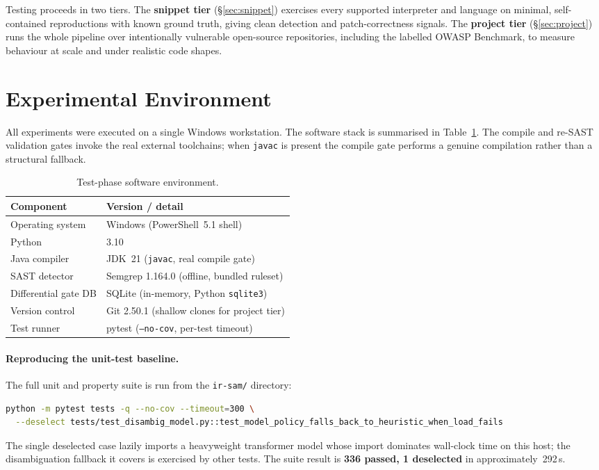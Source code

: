 \documentclass[11pt,a4paper]{article}
\newcommand{\code}[1]{\texttt{\small #1}}
\begin{document}
Testing proceeds in two tiers. The \textbf{snippet tier}
(\S\ref{sec:snippet}) exercises every supported interpreter and language
on minimal, self-contained reproductions with known ground truth, giving
clean detection and patch-correctness signals. The \textbf{project tier}
(\S\ref{sec:project}) runs the whole pipeline over intentionally
vulnerable open-source repositories, including the labelled OWASP
Benchmark, to measure behaviour at scale and under realistic code shapes.

\section{Experimental Environment}
\label{sec:env}
All experiments were executed on a single Windows workstation. The
software stack is summarised in Table~\ref{tab:env}. The compile and
re-SAST validation gates invoke the real external toolchains; when
\code{javac} is present the compile gate performs a genuine compilation
rather than a structural fallback.

\begin{table}[h]
\centering
\caption{Test-phase software environment.}
\label{tab:env}
\begin{tabular}{@{}ll@{}}
\toprule
\textbf{Component} & \textbf{Version / detail} \\
\midrule
Operating system        & Windows (PowerShell~5.1 shell) \\
Python                  & 3.10 \\
Java compiler           & JDK~21 (\code{javac}, real compile gate) \\
SAST detector           & Semgrep 1.164.0 (offline, bundled ruleset) \\
Differential gate DB    & SQLite (in-memory, Python \code{sqlite3}) \\
Version control         & Git 2.50.1 (shallow clones for project tier) \\
Test runner             & pytest (\code{--no-cov}, per-test timeout) \\
\bottomrule
\end{tabular}
\end{table}

\paragraph{Reproducing the unit-test baseline.} The full unit and
property suite is run from the \code{ir-sam/} directory:
\begin{lstlisting}[language=bash]
python -m pytest tests -q --no-cov --timeout=300 \
  --deselect tests/test_disambig_model.py::test_model_policy_falls_back_to_heuristic_when_load_fails
\end{lstlisting}
The single deselected case lazily imports a heavyweight transformer model
whose import dominates wall-clock time on this host; the disambiguation
fallback it covers is exercised by other tests. The suite result is
\textbf{336 passed, 1 deselected} in approximately~292\,s.
\end{document}
